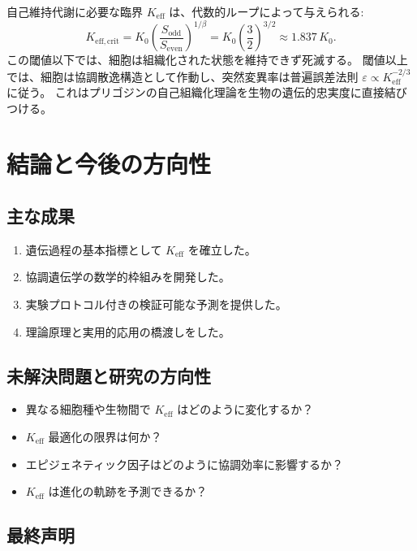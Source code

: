 \documentclass[12pt]{article}
\newcommand{\Keff}{K_{\mathrm{eff}}}
\begin{document}
	自己維持代謝に必要な臨界 $\Keff$ は、代数的ループによって与えられる:
	\begin{equation}
		K_{\mathrm{eff},\mathrm{crit}} = K_0 \left( \frac{S_{\mathrm{odd}}}{S_{\mathrm{even}}} \right)^{1/\beta}
		= K_0 \left( \frac{3}{2} \right)^{3/2} \approx 1.837\,K_0 .
	\end{equation}
	この閾値以下では、細胞は組織化された状態を維持できず死滅する。
	閾値以上では、細胞は協調散逸構造として作動し、突然変異率は普遍誤差法則 $\varepsilon \propto \Keff^{-2/3}$ に従う。
	これはプリゴジンの自己組織化理論を生物の遺伝的忠実度に直接結びつける。
	
	\section{結論と今後の方向性}
	
	\subsection{主な成果}
	
	\begin{enumerate}
		\item 遺伝過程の基本指標として $K_{\text{eff}}$ を確立した。
		\item 協調遺伝学の数学的枠組みを開発した。
		\item 実験プロトコル付きの検証可能な予測を提供した。
		\item 理論原理と実用的応用の橋渡しをした。
	\end{enumerate}
	
	\subsection{未解決問題と研究の方向性}
	
	\begin{itemize}
		\item 異なる細胞種や生物間で $K_{\text{eff}}$ はどのように変化するか？
		\item $K_{\text{eff}}$ 最適化の限界は何か？
		\item エピジェネティック因子はどのように協調効率に影響するか？
		\item $K_{\text{eff}}$ は進化の軌跡を予測できるか？
	\end{itemize}
	
	\subsection{最終声明}
	
\end{document}
